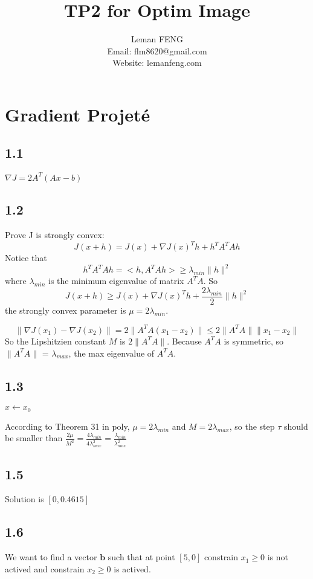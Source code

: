 \documentclass{article}
\title{TP2 for Optim Image}
\author{Leman FENG\\ Email: flm8620@gmail.com\\Website: lemanfeng.com}
\begin{document}
	\maketitle
\section*{Gradient Projeté}
\subsection*{1.1}
$ \nabla J = 2A^T(Ax-b) $
\subsection*{1.2}
Prove J is strongly convex:
$$
J(x+h) = J(x)+ \nabla J(x)^T h + h^TA^TAh
$$
Notice that
$$
h^TA^TAh = <h, A^TAh> \geq \lambda_{min} \lVert h \rVert^2 
$$
where $\lambda_{min}$ is the minimum eigenvalue of matrix $A^TA$. So 
$$
J(x+h) \geq J(x)+ \nabla J(x)^T h + \frac{2\lambda_{min}}{2} \lVert h \rVert^2 
$$
the strongly convex parameter is $\mu = 2\lambda_{min}$.

$$
\lVert \nabla J(x_1)-\nabla J(x_2) \rVert = 2 \lVert A^TA(x_1-x_2) \rVert \leq 2\lVert A^TA \rVert \lVert x_1-x_2 \rVert
$$
So the Lipshitzien constant $M$ is $2\lVert A^TA \rVert$. Because $A^TA$ is symmetric, so $\lVert A^TA \rVert$ = $\lambda_{max}$, the max eigenvalue of $A^TA$.
\subsection*{1.3}
\begin{algorithm}[H]
	$x \leftarrow x_0$\\
\end{algorithm}
According to Theorem 31 in poly, $\mu = 2\lambda_{min}$ and $M=2\lambda_{max}$, so the step $\tau$ should be smaller than $\frac{2\mu}{M^2} = \frac{4\lambda_{min}}{4\lambda_{max}^2} = \frac{\lambda_{min}}{\lambda_{max}^2}$

\subsection*{1.5}
Solution is $[0,0.4615]$
\subsection*{1.6}
We want to find a vector $\mathbf{b}$ such that at point $[5,0]$ constrain $x_1 \geq 0$ is not actived and constrain $x_2\geq 0$ is actived.
\end{document}
